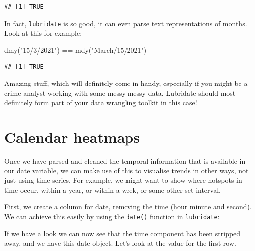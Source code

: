 \documentclass[
]{book}
\newenvironment{Shaded}{\begin{snugshade}}{\end{snugshade}}
\newcommand{\FunctionTok}[1]{\textcolor[rgb]{0.00,0.00,0.00}{#1}}
\newcommand{\NormalTok}[1]{#1}
\newcommand{\OtherTok}[1]{\textcolor[rgb]{0.56,0.35,0.01}{#1}}
\newcommand{\SpecialCharTok}[1]{\textcolor[rgb]{0.00,0.00,0.00}{#1}}
\newcommand{\StringTok}[1]{\textcolor[rgb]{0.31,0.60,0.02}{#1}}
\begin{document}
\begin{verbatim}
## [1] TRUE
\end{verbatim}

In fact, \texttt{lubridate} is so good, it can even parse text representations of months. Look at this for example:

\begin{Shaded}
\begin{Highlighting}[]
\FunctionTok{dmy}\NormalTok{(}\StringTok{"15/3/2021"}\NormalTok{) }\SpecialCharTok{==} \FunctionTok{mdy}\NormalTok{(}\StringTok{"March/15/2021"}\NormalTok{)}
\end{Highlighting}
\end{Shaded}

\begin{verbatim}
## [1] TRUE
\end{verbatim}

Amazing stuff, which will definitely come in handy, especially if you might be a crime analyst working with some messy messy data. Lubridate should most definitely form part of your data wrangling toolkit in this case!

\hypertarget{calendar-heatmaps}{%
\section{Calendar heatmaps}\label{calendar-heatmaps}}

Once we have parsed and cleaned the temporal information that is available in our date variable, we can make use of this to visualise trends in other ways, not just using time series. For example, we might want to show where hotspots in time occur, within a year, or within a week, or some other set interval.

First, we create a column for date, removing the time (hour minute and second). We can achieve this easily by using the \texttt{date()} function in \texttt{lubridate}:

\begin{Shaded}
\end{Shaded}

If we have a look we can now see that the time component has been stripped away, and we have this date object. Let's look at the value for the first row.
\end{document}
